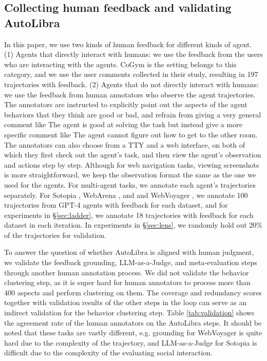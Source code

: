 \subsection{Collecting human feedback and validating AutoLibra}
\label{sec:collecting-human-feedback}

In this paper, we use two kinds of human feedback for different kinds of agent. (1) Agents that directly interact
with humans: we use the feedback from the users who are interacting with the agents. CoGym \citep{shao2024collaborative}
is the setting belongs to this category, and we use the user comments collected in their study, resulting
in 197 trajectories with feedback. (2) Agents that 
do not directly interact with humans: we use the feedback from human annotators who observe the agent trajectories.
The annotators are instructed to explicitly point out the aspects of the agent behaviors that they think are good or bad,
and refrain from giving a very general comment like \textsf{The agent is good at solving the task}
but instead give a more specific comment like \textsf{The agent cannot figure out how to get to the other room}.
The annotators can also choose from a TTY and a web interface, on both of which they first check out the agent's task,
and then view the agent's observation and actions step by step. Although for web navigation tasks, viewing screenshots
is more straightforward, we keep the observation format the same as the one we used for the agents. 
For multi-agent tasks, we annotate each agent's trajectories separately. For Sotopia \citep{zhousotopia}, WebArena \citep{zhouwebarena}, and
and WebVoyager \citep{he2024webvoyager}, we annotate 100 trajectories from GPT-4 \citep{achiam2023gpt} agents with feedback for each dataset,
and for experiments in \S\ref{sec:ladder}, we annotate 18 trajectories with feedback for each dataset in each
iteration. In experiments in \S\ref{sec:lens}, we randomly hold out 20\% of the trajectories for validation.


To answer the question of whether AutoLibra is aligned with human judgment,
we validate the feedback grounding, LLM-as-a-Judge, and meta-evaluation steps through another human annotation process.
We did not validate the behavior clustering step, as it is super hard for human annotators to
process more than 400 aspects and perform clustering on them. The coverage and redundancy scores
together with validation results of the other steps in the loop can serve as an indirect validation for the 
behavior clustering step.
Table \ref{tab:validation} shows the agreement rate of the human annotators on the AutoLibra steps. 
It should be noted that these tasks are vastly different, e.g. grounding for WebVoyager \citep{he2024webvoyager} is quite hard 
due to the complexity of the trajectory, and LLM-as-a-Judge for Sotopia \citep{zhousotopia} is 
difficult due to the complexity of the evaluating social interaction. 


